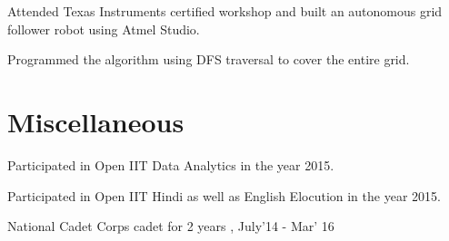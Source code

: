 \documentclass[a4paper]{deedy-resume} %
\begin{document}
\begin{minipage}[t]{0.66\textwidth}
  \sectionspace

  \runsubsection{}
  \begin{tightitemize}
  \item Attended Texas Instruments certified workshop and built an autonomous grid follower robot using Atmel Studio.
  \item Programmed the algorithm using DFS traversal to cover the entire grid.
  \end{tightitemize}

  \section{Miscellaneous}
  \vspace{\topsep}
  \begin{tightitemize}
  \item Participated in Open IIT Data Analytics in the year 2015.
  \item Participated in Open IIT Hindi as well as English Elocution in the year 2015.
  \item National Cadet Corps cadet for 2 years , July'14 - Mar' 16
  \end{tightitemize}
\end{minipage}
\end{document}
